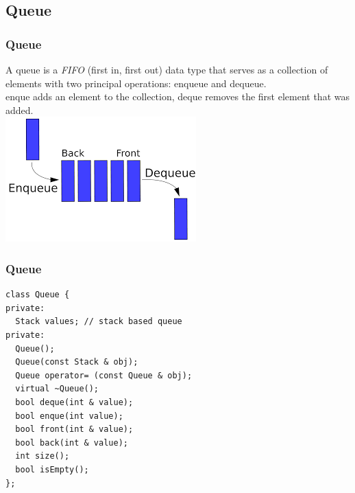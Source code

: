 \subsection{Queue}
\begin{frame}[fragile]
\frametitle{Queue}
A queue is a \emph{FIFO} (first in, first out) data type that serves as a collection
of elements with two principal operations: enqueue and dequeue.\\
enque adds an element to the collection, deque removes the first element that was added.\\
\vspace{1mm}
\includegraphics[scale=0.3]{img/queue.png}
\end{frame}

\begin{frame}[fragile]
\frametitle{Queue}
{\tiny
\begin{lstlisting}
class Queue {
private:
  Stack values; // stack based queue
private:
  Queue();
  Queue(const Stack & obj);
  Queue operator= (const Queue & obj);
  virtual ~Queue();
  bool deque(int & value);
  bool enque(int value);
  bool front(int & value);
  bool back(int & value);
  int size();
  bool isEmpty();
};
\end{lstlisting}
}
\end{frame}
